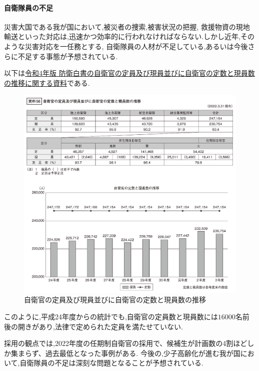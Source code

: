 \documentclass{article}[jsarticle]
\begin{document}
\paragraph{自衛隊員の不足} \par 
災害大国である我が国において,被災者の捜索,被害状況の把握,
救援物資の現地輸送といった対応は,迅速かつ効率的に行われなければならない.しかし近年,そのような災害対応を一任務とする,
自衛隊員の人材が不足している,あるいは今後さらに不足する事態が予想されている.\par 
以下は\href{http://www.clearing.mod.go.jp/hakusho_data/2022/html/ns056000.html}{令和4年版 防衛白書の自衛官の定員及び現員並びに自衛官の定数と現員数の推移に関する資料}である.
\begin{figure}[H]
    \centering
    \includegraphics[scale=0.3]{./Images/20240203195052.png}
    \caption{自衛官の定員及び現員並びに自衛官の定数と現員数の推移}
\end{figure}
このように,平成24年度からの統計でも,自衛官の定員数と現員数には$16000$名前後の開きがあり,法律で定められた定員を満たせていない.\par
採用の観点では,2022年度の任期制自衛官の採用で、候補生が計画数の4割ほどしか集まらず、過去最低となった事例がある\cite{news01}.
今後の,少子高齢化が進む我が国において,自衛隊員の不足は深刻な問題となることが予想されている.
\end{document}
